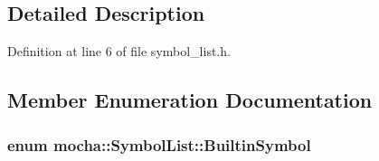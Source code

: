 \subsection{Detailed Description}


Definition at line 6 of file symbol\_\-list.h.



\subsection{Member Enumeration Documentation}
\hypertarget{classmocha_1_1_symbol_list_ae6106c4f71f0e9abecd8f3f9f5500d66}{
\subsubsection[{BuiltinSymbol}]{\setlength{\rightskip}{0pt plus 5cm}enum {\bf mocha::SymbolList::BuiltinSymbol}}}
\label{classmocha_1_1_symbol_list_ae6106c4f71f0e9abecd8f3f9f5500d66}

